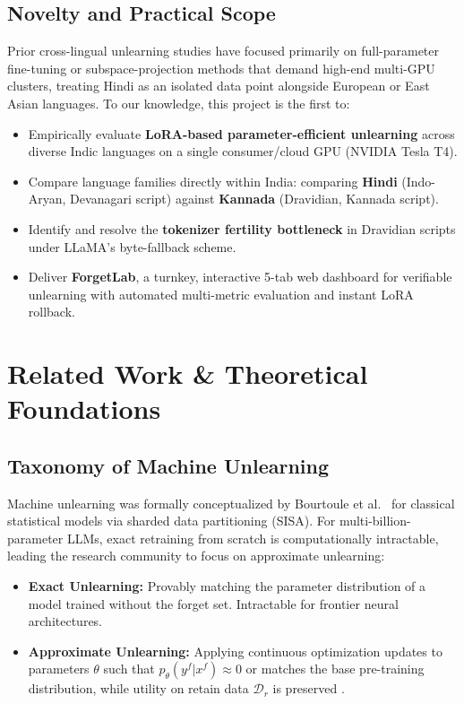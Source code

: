 \documentclass[11pt,a4paper]{article}
\begin{document}
\subsection{Novelty and Practical Scope}
Prior cross-lingual unlearning studies \cite{choi2024, xiang2026, lizzo2026, farashah2026} have focused primarily on full-parameter fine-tuning or subspace-projection methods that demand high-end multi-GPU clusters, treating Hindi as an isolated data point alongside European or East Asian languages. To our knowledge, this project is the first to:
\begin{itemize}
    \item Empirically evaluate \textbf{LoRA-based parameter-efficient unlearning} across diverse Indic languages on a single consumer/cloud GPU (NVIDIA Tesla T4).
    \item Compare language families directly within India: comparing \textbf{Hindi} (Indo-Aryan, Devanagari script) against \textbf{Kannada} (Dravidian, Kannada script).
    \item Identify and resolve the \textbf{tokenizer fertility bottleneck} in Dravidian scripts under LLaMA's byte-fallback scheme.
    \item Deliver \textbf{ForgetLab}, a turnkey, interactive 5-tab web dashboard for verifiable unlearning with automated multi-metric evaluation and instant LoRA rollback.
\end{itemize}

\section{Related Work \& Theoretical Foundations}
\label{sec:related_work}

\subsection{Taxonomy of Machine Unlearning}
Machine unlearning was formally conceptualized by Bourtoule et al.\ \cite{bourtoule2021machine} for classical statistical models via sharded data partitioning (SISA). For multi-billion-parameter LLMs, exact retraining from scratch is computationally intractable, leading the research community to focus on approximate unlearning:
\begin{itemize}
    \item \textbf{Exact Unlearning:} Provably matching the parameter distribution of a model trained without the forget set. Intractable for frontier neural architectures.
    \item \textbf{Approximate Unlearning:} Applying continuous optimization updates to parameters $\theta$ such that $p_\theta(y^f | x^f) \approx 0$ or matches the base pre-training distribution, while utility on retain data $\mathcal{D}_r$ is preserved \cite{eldan2023harrypotter, chundawat2023zero}.
\end{itemize}
\end{document}
